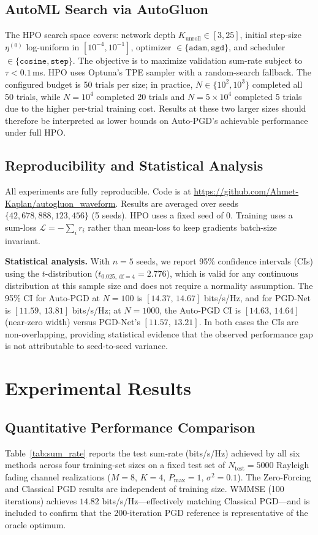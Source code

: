 \documentclass[conference,11pt]{IEEEtran}
\begin{document}
\subsection{AutoML Search via AutoGluon}
\label{sec:hpo}
The HPO search space covers: network depth $K_{\text{unroll}}\in[3,25]$, initial step-size $\eta^{(0)}$ log-uniform in $[10^{-4},10^{-1}]$, optimizer $\in\{\texttt{adam},\texttt{sgd}\}$, and scheduler $\in\{\texttt{cosine},\texttt{step}\}$. The objective is to maximize validation sum-rate subject to $\tau<0.1$\,ms. HPO uses Optuna's TPE sampler with a random-search fallback. The configured budget is 50 trials per size; in practice, $N\in\{10^2,10^3\}$ completed all 50 trials, while $N{=}10^4$ completed 20 trials and $N{=}5\!\times\!10^4$ completed 5 trials due to the higher per-trial training cost. Results at these two larger sizes should therefore be interpreted as lower bounds on Auto-PGD's achievable performance under full HPO.

\subsection{Reproducibility and Statistical Analysis}
All experiments are fully reproducible. Code is at \url{https://github.com/Ahmet-Kaplan/autogluon_waveform}. Results are averaged over seeds $\{42, 678, 888, 123, 456\}$ (5 seeds). HPO uses a fixed seed of 0. Training uses a sum-loss $\mathcal{L}=-\sum_i r_i$ rather than mean-loss to keep gradients batch-size invariant.

\textbf{Statistical analysis.} With $n{=}5$ seeds, we report 95\% confidence intervals (CIs) using the $t$-distribution ($t_{0.025,\,\mathrm{df}{=}4} = 2.776$), which is valid for any continuous distribution at this sample size and does not require a normality assumption. The 95\% CI for Auto-PGD at $N{=}100$ is $[14.37,\,14.67]$ bits/s/Hz, and for PGD-Net is $[11.59,\,13.81]$ bits/s/Hz; at $N{=}1000$, the Auto-PGD CI is $[14.63,\,14.64]$ (near-zero width) versus PGD-Net's $[11.57,\,13.21]$. In both cases the CIs are non-overlapping, providing statistical evidence that the observed performance gap is not attributable to seed-to-seed variance.

\section{Experimental Results}

\subsection{Quantitative Performance Comparison}
Table~\ref{tab:sum_rate} reports the test sum-rate (bits/s/Hz) achieved by all six methods across four training-set sizes on a fixed test set of $N_{\text{test}}=5000$ Rayleigh fading channel realizations ($M=8$, $K=4$, $P_{\max}=1$, $\sigma^2=0.1$). The Zero-Forcing and Classical PGD results are independent of training size. WMMSE (100 iterations) achieves $14.82$ bits/s/Hz—effectively matching Classical PGD—and is included to confirm that the 200-iteration PGD reference is representative of the oracle optimum.
\end{document}
